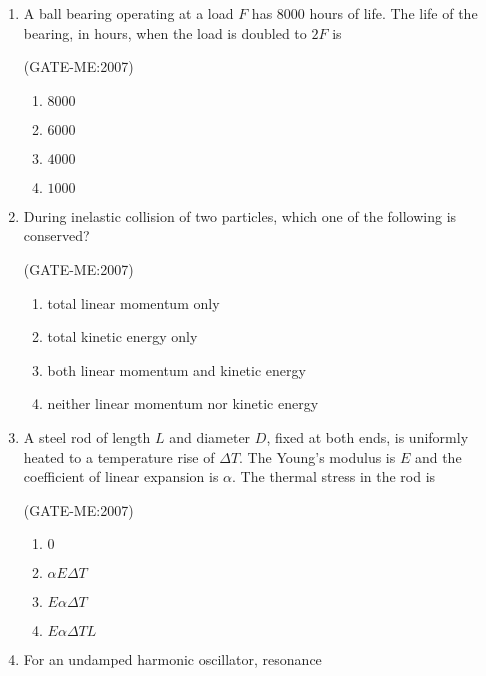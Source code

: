 \documentclass[journal,12pt,onecolumn]{IEEEtran}
\theoremstyle{remark}
\begin{document}
\begin{enumerate}




\begin{multicols}{4}
\begin{enumerate}
    \item $25$
    \item $30$
    \item $35$
    \item $60$
\end{enumerate}
\end{multicols}

\item A ball bearing operating at a load $F$ has 8000 hours of life. The life of the bearing, in hours, when the load is doubled to $2F$ is

	\hfill{(GATE-ME:2007)}
\begin{multicols}{2}
\begin{enumerate}
    \item $8000$
    \item $6000$
    \item $4000$
    \item $1000$
\end{enumerate}
\end{multicols}

\item During inelastic collision of two particles, which one of the following is conserved? 

	\hfill{(GATE-ME:2007)}
\begin{multicols}{1}
\begin{enumerate}
    \item total linear momentum only
    \item total kinetic energy only
    \item both linear momentum and kinetic energy
    \item neither linear momentum nor kinetic energy
\end{enumerate}
\end{multicols}

\item A steel rod of length $L$ and diameter $D$, fixed at both ends, is uniformly heated to a temperature rise of $\Delta T$. The Young's modulus is $E$ and the coefficient of linear expansion is $\alpha$. The thermal stress in the rod is

	\hfill{(GATE-ME:2007)}
	\begin{multicols}{2}
\begin{enumerate}
    \item $0$
    \item $\alpha E \Delta T$
    \item $E \alpha \Delta T$
    \item $E \alpha \Delta T L$
\end{enumerate}
\end{multicols}
\item For an undamped harmonic oscillator, resonance 


\end{enumerate}
\end{document}
